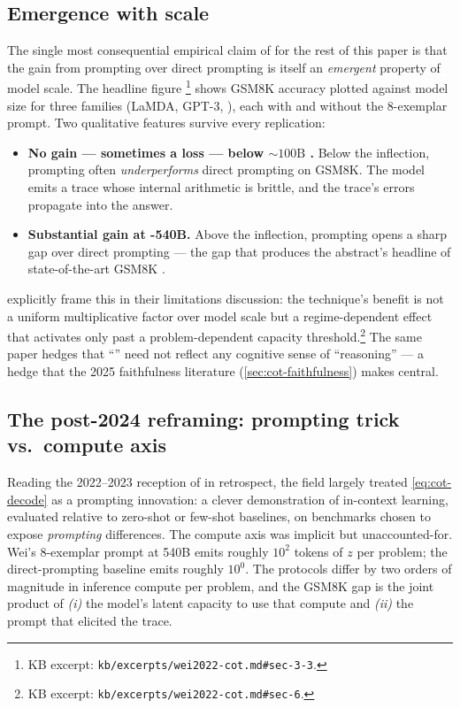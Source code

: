 \subsection{Emergence with scale}
\label{sec:cot-emergence}

The single most consequential empirical claim of
\citet{wei2022-cot} for the rest of this paper is that the gain from
 prompting over direct prompting is itself an
\emph{emergent} property of model scale. The headline figure
\citep[\S 3.3, fig.\ 4]{wei2022-cot}\footnote{KB excerpt:
\nolinkurl{kb/excerpts/wei2022-cot.md#sec-3-3}.} shows GSM8K accuracy
plotted against model size for three families (LaMDA, GPT-3, ),
each with and without the 8-exemplar  prompt. Two qualitative
features survive every replication:
\begin{itemize}
\item \textbf{No gain — sometimes a loss — below ${\sim}100\text{B}$
.} Below the inflection,  prompting often
\emph{underperforms} direct prompting on GSM8K. The model emits a
trace whose internal arithmetic is brittle, and the trace's errors
propagate into the answer.
\item \textbf{Substantial gain at -540B.} Above the inflection,
 prompting opens a sharp gap over direct prompting — the gap that
produces the abstract's headline of state-of-the-art GSM8K
\citep[abstract]{wei2022-cot}.
\end{itemize}
\citet[\S 6]{wei2022-cot} explicitly frame this in their limitations
discussion: the technique's benefit is not a uniform multiplicative
factor over model scale but a regime-dependent effect that activates
only past a problem-dependent capacity threshold.\footnote{KB excerpt:
\nolinkurl{kb/excerpts/wei2022-cot.md#sec-6}.} The same paper hedges
that ``'' need not reflect any cognitive sense of
``reasoning'' — a hedge that the 2025 faithfulness literature
(\cref{sec:cot-faithfulness}) makes central.

\subsection{The post-2024 reframing: prompting trick vs.\ compute axis}
\label{sec:cot-reframing}

Reading the 2022--2023 reception of  in retrospect, the field largely
treated \cref{eq:cot-decode} as a prompting innovation: a clever
demonstration of in-context learning, evaluated relative to
zero-shot or few-shot baselines, on benchmarks chosen to expose
\emph{prompting} differences. The compute axis was implicit but
unaccounted-for. Wei's 8-exemplar  prompt at 540B emits roughly
$10^2$ tokens of $z$ per problem; the direct-prompting baseline emits
roughly $10^0$. The protocols differ by two orders of magnitude in
inference compute per problem, and the GSM8K gap is the joint product
of \emph{(i)} the model's latent capacity to use that compute and
\emph{(ii)} the prompt that elicited the trace.

